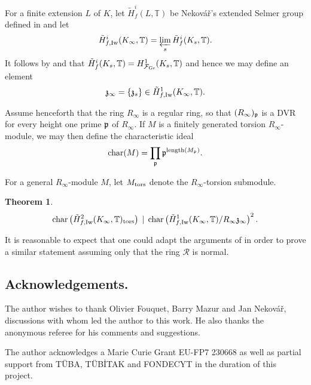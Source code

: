 \documentclass[12pt]{amsart}
\numberwithin{equation}{section}
\newtheorem{thm}{Theorem}[section]
\begin{document}
For a finite extension $L$ of $K$, let $\tilde{H}^i_{f}(L, {\mathbb{T}})$ be Nekov\'a\v{r}'s extended Selmer group defined in \cite[\S6]{nek} and let
$$\tilde{H}^i_{f,\textup{Iw}}(K_\infty, {\mathbb{T}})=\varprojlim_s \tilde{H}^i_{f}(K_s, {\mathbb{T}}).$$
It follows by \cite[Lemma 9.6.3]{nek} and \cite[Lemma 2.4.4]{howard} that $\tilde{H}^i_{f}(K_s, {\mathbb{T}})=H^1_{{\mathcal{F}}_\textup{Gr}}(K_s,{\mathbb{T}})$ and hence we may define an element
  $$\frak{z}_\infty=\{\frak{z}_s\} \in \tilde{H}^1_{f,\textup{Iw}}(K_\infty, {\mathbb{T}}).$$

Assume henceforth that the ring $R_\infty$ is a regular ring, so that $(R_\infty)_{\frak{p}}$ is a DVR for every height one prime $\frak{p}$ of $R_\infty$. If $M$ is a finitely generated torsion $R_\infty$-module, we may then define the characteristic ideal
$$\textup{char}(M)=\prod_{\frak{p}}\frak{p}^{\textup{length}(M_\frak{p})}.$$

For a general $R_\infty$-module $M$, let $M_{\textup{tors}}$ denote the $R_\infty$-torsion submodule.

\begin{thm}
\label{thm:mainappl}
$$\textup{char}\left(\tilde{H}^2_{f,\textup{Iw}}(K_\infty, {\mathbb{T}})_{\textup{tors}}\right)\,\mid \, \textup{char}\left(\tilde{H}^1_{f,\textup{Iw}}(K_\infty, {\mathbb{T}})/R_\infty\frak{z}_\infty\right)^2.$$
\end{thm}

It is reasonable to expect that one could adapt the arguments of \cite{arnold} in order to prove a similar statement assuming only that the ring ${\mathcal{R}}$ is normal.

\subsection*{Acknowledgements.}
\label{sec:applications} The author wishes to thank Olivier Fouquet, Barry Mazur  and Jan Nekov\'{a}\v{r}, discussions with whom led the author to this work. He also thanks the anonymous referee for his comments and suggestions.

The author acknowledges a Marie Curie
Grant EU-FP7 230668 as well as partial support from T\"UBA, T\"UB\.ITAK and FONDECYT in the duration of this project.
{\scriptsize


}
\end{document}
